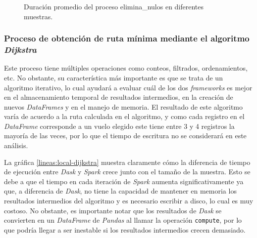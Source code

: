 \begin{figure}
\centering
{}
\caption{Duración promedio del proceso elimina\_nulos en diferentes muestras.}
\label{lineas:local-elimina-nulos}
\end{figure}

\subsubsection{Proceso de obtención de ruta mínima mediante el algoritmo \textit{Dijkstra}}

Este proceso tiene múltiples operaciones como conteos, filtrados, ordenamientos, etc. No obstante, su característica más importante es que se trata de un algoritmo iterativo, lo cual ayudará a evaluar cuál de los dos \textit{frameworks} es mejor en el almacenamiento temporal de resultados intermedios, en la creación de nuevos \textit{DataFrames} y en el manejo de memoria. El resultado de este algoritmo varía de acuerdo a la ruta calculada en el algoritmo, y como cada registro en el \textit{DataFrame} corresponde a un vuelo elegido este tiene entre 3 y 4 registros la mayoría de las veces, por lo que el tiempo de escritura no se considerará en este análisis.

La gráfica \ref{lineas:local-dijkstra} muestra claramente cómo la diferencia de tiempo de ejecución entre \textit{Dask} y \textit{Spark} crece junto con el tamaño de la muestra. Esto se debe a que el tiempo en cada iteración de \textit{Spark} aumenta significativamente ya que, a diferencia de \textit{Dask}, no tiene la capacidad de mantener en memoria los resultados intermedios del algoritmo y es necesario escribir a disco, lo cual es muy costoso. No obstante, es importante notar que los resultados de \textit{Dask} se convierten en un \textit{DataFrame} de \textit{Pandas} al llamar la operación \texttt{compute}, por lo que podría llegar a ser inestable si los resultados intermedios crecen demasiado.

